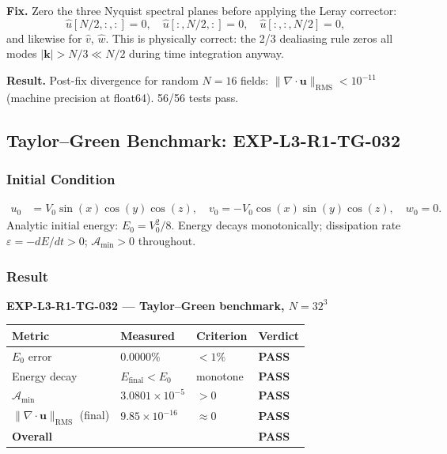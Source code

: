 \documentclass[11pt, a4paper]{article}
\theoremstyle{definition}
\theoremstyle{remark}
\newenvironment{keyresult}{%
  \begin{tcolorbox}[colback=tfgreen!6, colframe=tfgreen!60!black,
    title=\textbf{Key Result}, fonttitle=\small\bfseries,
    breakable, left=4pt, right=4pt, top=4pt, bottom=4pt]
}{%
  \end{tcolorbox}
}
\newcommand{\Afield}{\mathcal{A}}
\newcommand{\PASS}{\textcolor{passgreen}{\textbf{PASS}}}
\begin{document}
\textbf{Fix.}
Zero the three Nyquist spectral planes before applying the Leray corrector:
\begin{equation}
  \hat{u}[N/2, :, :] = 0, \quad
  \hat{u}[:, N/2, :] = 0, \quad
  \hat{u}[:, :, N/2] = 0,
  \label{eq:nyquist-fix}
\end{equation}
and likewise for $\hat{v}$, $\hat{w}$.
This is physically correct: the 2/3 dealiasing rule zeros all modes
$|\mathbf{k}| > N/3 \ll N/2$ during time integration anyway.

\textbf{Result.} Post-fix divergence for random $N=16$ fields:
$\|\nabla\cdot\mathbf{u}\|_{\mathrm{RMS}} < 10^{-11}$ (machine precision at float64).
56/56 tests pass.

\subsection{Taylor--Green Benchmark: EXP-L3-R1-TG-032}

\subsubsection{Initial Condition}

\begin{align}
  u_0 &= V_0\sin(x)\cos(y)\cos(z), \quad
  v_0 = -V_0\cos(x)\sin(y)\cos(z), \quad
  w_0 = 0.
\end{align}
Analytic initial energy: $E_0 = V_0^2/8$. Energy decays monotonically;
dissipation rate $\varepsilon = -dE/dt > 0$; $\Afield_{\min} > 0$ throughout.

\subsubsection{Result}

\begin{keyresult}
\textbf{EXP-L3-R1-TG-032 --- Taylor--Green benchmark, $N=32^3$}\\[4pt]
\begin{tabular}{llll}
\toprule
\textbf{Metric} & \textbf{Measured} & \textbf{Criterion} & \textbf{Verdict} \\
\midrule
$E_0$ error & $0.0000\%$ & $< 1\%$ & \PASS \\
Energy decay & $E_{\mathrm{final}} < E_0$ & monotone & \PASS \\
$\Afield_{\min}$ & $3.0801\times10^{-5}$ & $> 0$ & \PASS \\
$\|\nabla\cdot\mathbf{u}\|_{\mathrm{RMS}}$ (final) & $9.85\times10^{-16}$ & $\approx 0$ & \PASS \\
\midrule
\textbf{Overall} & & & \PASS \\
\bottomrule
\end{tabular}
\end{keyresult}
\end{document}
